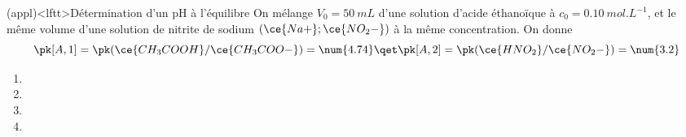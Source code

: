 \documentclass[../../main/main.tex]{subfiles}
\begin{document}
\begin{tcb*}(appl)<lftt>{Détermination d'un pH à l'équilibre}
	On mélange $V_0 = \SI{50}{mL}$ d'une solution d'acide éthanoïque à
	$c_0 = \SI{0.10}{mol.L^{-1}}$, et le même volume d'une solution de nitrite de sodium
	$\left( \ce{Na+};\ce{NO_2-} \right)$ à la même concentration. On donne
	\[
		\pk[A,1] = \pk(\ce{CH_3COOH}/\ce{CH_3COO-}) = \num{4.74}
		\qet
		\pk[A,2] = \pk(\ce{HNO_2}/\ce{NO_2-}) = \num{3.2}
	\]
	\begin{center}
	\end{center}
	\tcblower
	\noindent
	\begin{minipage}[t]{.60\linewidth}
		\begin{enumerate}[label=\sqenumi]
			\item {}
			\item {}
			\item {}
			\item {}
		\end{enumerate}
	\end{minipage}
	\hfill
	\begin{minipage}[t]{.35\linewidth}
		\vspace{0pt}
		\begin{center}
			\sswitch{
}
\end{center}
\end{minipage}
\end{tcb*}
\end{document}
